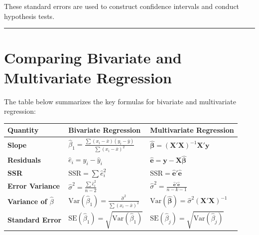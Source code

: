 \documentclass[
  letterpaper,
  DIV=11,
  numbers=noendperiod]{scrreprt}
\begin{document}
These standard errors are used to construct confidence intervals and
conduct hypothesis tests.

\begin{center}\rule{0.5\linewidth}{0.5pt}\end{center}

\section{Comparing Bivariate and Multivariate
Regression}\label{comparing-bivariate-and-multivariate-regression}

The table below summarizes the key formulas for bivariate and
multivariate regression:

\begin{longtable}[]{@{}
  >{\raggedright\arraybackslash}p{}
  >{\raggedright\arraybackslash}p{}
  >{\raggedright\arraybackslash}p{}@{}}
\toprule\noalign{}
\begin{minipage}[b]{\linewidth}\raggedright
Quantity
\end{minipage} & \begin{minipage}[b]{\linewidth}\raggedright
Bivariate Regression
\end{minipage} & \begin{minipage}[b]{\linewidth}\raggedright
Multivariate Regression
\end{minipage} \\
\midrule\noalign{}
\endhead
\bottomrule\noalign{}
\endlastfoot
\textbf{Slope} &
\(\hat{\beta}_1 = \frac{\sum (x_i - \bar{x})(y_i - \bar{y})}{\sum (x_i - \bar{x})^2}\)
&
\(\hat{\boldsymbol{\beta}} = (\mathbf{X}'\mathbf{X})^{-1} \mathbf{X}' \mathbf{y}\) \\
\textbf{Residuals} & \(\hat{e}_i = y_i - \hat{y}_i\) &
\(\hat{\mathbf{e}} = \mathbf{y} - \mathbf{X} \hat{\boldsymbol{\beta}}\) \\
\textbf{SSR} & \(\text{SSR} = \sum \hat{e}_i^2\) &
\(\text{SSR} = \hat{\mathbf{e}}' \hat{\mathbf{e}}\) \\
\textbf{Error Variance} &
\(\hat{\sigma}^2 = \frac{\sum \hat{e}_i^2}{n - 2}\) &
\(\hat{\sigma}^2 = \frac{\hat{\mathbf{e}}' \hat{\mathbf{e}}}{n - k - 1}\) \\
\textbf{Variance of \(\hat{\beta}\)} &
\(\text{Var}(\hat{\beta}_1) = \frac{\hat{\sigma}^2}{\sum (x_i - \bar{x})^2}\)
&
\(\text{Var}(\hat{\boldsymbol{\beta}}) = \hat{\sigma}^2 (\mathbf{X}'\mathbf{X})^{-1}\) \\
\textbf{Standard Error} &
\(\text{SE}(\hat{\beta}_1) = \sqrt{\text{Var}(\hat{\beta}_1)}\) &
\(\text{SE}(\hat{\beta}_j) = \sqrt{\text{Var}(\hat{\beta}_j)}\) \\
\end{longtable}
\end{document}

